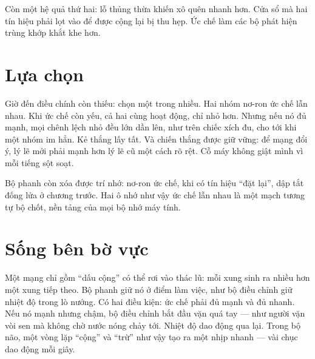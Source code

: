 
Còn một hệ quả thứ hai: lỗ thủng thừa khiến xô quên nhanh hơn. Cửa sổ mà hai tín hiệu phải lọt vào để được cộng lại bị thu hẹp. Ức chế làm các bộ phát hiện trùng khớp khắt khe hơn.

\section*{Lựa chọn}

Giờ đến điều chính còn thiếu: chọn một trong nhiều. Hai nhóm nơ-ron ức chế lẫn nhau. Khi ức chế còn yếu, cả hai cùng hoạt động, chỉ nhỏ hơn. Nhưng nếu nó đủ mạnh, mọi chênh lệch nhỏ đều lớn dần lên, như trên chiếc xích đu, cho tới khi một nhóm im hẳn. Kẻ thắng lấy tất. Và chiến thắng được giữ vững: để mạng đổi ý, lý lẽ mới phải mạnh hơn lý lẽ cũ một cách rõ rệt. Cỗ máy không giật mình vì mỗi tiếng sột soạt.

Bộ phanh còn xóa được trí nhớ: nơ-ron ức chế, khi có tín hiệu ``đặt lại'', dập tắt đống lửa ở chương trước. Hai ô nhớ như vậy ức chế lẫn nhau là một mạch tương tự bộ chốt, nền tảng của mọi bộ nhớ máy tính.

\section*{Sống bên bờ vực}

Một mạng chỉ gồm ``dấu cộng'' có thể rơi vào thác lũ: mỗi xung sinh ra nhiều hơn một xung tiếp theo. Bộ phanh giữ nó ở điểm làm việc, như bộ điều chỉnh giữ nhiệt độ trong lò nướng. Có hai điều kiện: ức chế phải đủ mạnh và đủ nhanh. Nếu nó mạnh nhưng chậm, bộ điều chỉnh bắt đầu vặn quá tay --- như người vặn vòi sen mà không chờ nước nóng chảy tới. Nhiệt độ dao động qua lại. Trong bộ não, một vòng lặp ``cộng'' và ``trừ'' như vậy tạo ra một nhịp nhanh --- vài chục dao động mỗi giây.

